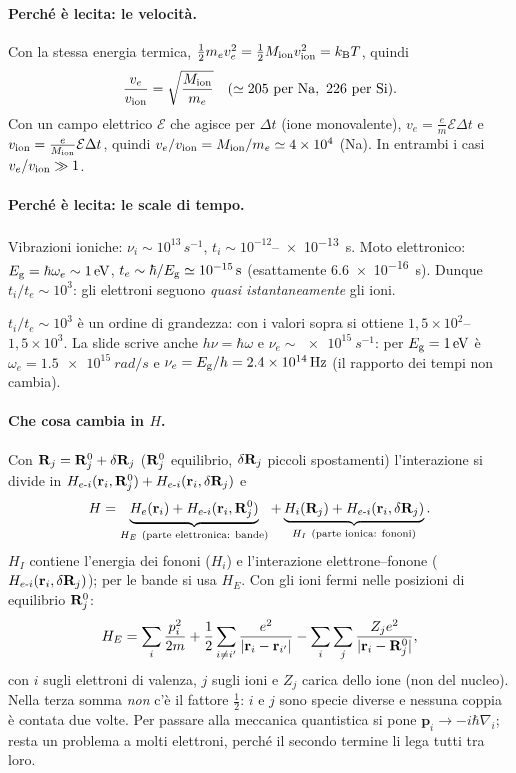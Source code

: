 \documentclass[11pt,a4paper]{article}
\begin{document}
\paragraph{Perché è lecita: le velocità.} Con la stessa energia termica, $\frac12m_ev_e^2=\frac12M_{\mathrm{ion}}v_{\mathrm{ion}}^2=k_{\mathrm B} T$, quindi
\[
\frac{v_e}{\vion}=\sqrt{\frac{M_{\mathrm{ion}}}{m_e}}\quad(\simeq205\ \text{per Na},\ 226\ \text{per Si}).
\]
Con un campo elettrico $\mathcal E$ che agisce per $\Delta t$ (ione monovalente), $v_e=\frac em\mathcal E\Delta t$ e $v_{\mathrm{ion}}=\frac e{M_{\mathrm{ion}}}\mathcal E\Delta t$, quindi
$v_e/v_{\mathrm{ion}}=M_{\mathrm{ion}}/m_e\simeq\num{4e4}$ (Na). In entrambi i casi $v_e/v_{\mathrm{ion}}\gg1$.

\paragraph{Perché è lecita: le scale di tempo.} Vibrazioni ioniche: $\nu_i\sim10^{13}\,\si{s^{-1}}$, $t_i\sim10^{-12}$--\SI{e-13}{s}. Moto elettronico: $E_{\mathrm g}=\hbar\omega_e\sim\SI{1}{eV}$,
$t_e\sim\hbar/E_{\mathrm g}\simeq\SI{e-15}{s}$ (esattamente \SI{6.6e-16}{s}). Dunque $t_i/t_e\sim10^3$: gli elettroni seguono \emph{quasi istantaneamente} gli ioni.

\begin{osservazione}
$t_i/t_e\sim10^3$ è un ordine di grandezza: con i valori sopra si ottiene $1{,}5\times10^2$--$1{,}5\times10^3$. La slide scrive anche $h\nu=\hbar\omega$ e
$\nu_e\sim\SI{e15}{s^{-1}}$: per $E_{\mathrm g}=\SI{1}{eV}$ è $\omega_e=\SI{1.5e15}{rad/s}$ e $\nu_e=E_{\mathrm g}/h=\SI{2.4e14}{Hz}$ (il rapporto dei tempi non cambia).
\end{osservazione}

\paragraph{Che cosa cambia in $H$.} Con $\mathbf R_j=\mathbf R_j^0+\delta\mathbf R_j$ ($\mathbf R_j^0$ equilibrio, $\delta\mathbf R_j$ piccoli spostamenti) l'interazione si divide in
$H_{e\text{-}i}(\mathbf r_i,\mathbf R_j^0)+H_{e\text{-}i}(\mathbf r_i,\delta\mathbf R_j)$ e
\[
H=\underbrace{H_e(\vr_i)+H_{e\text{-}i}(\vr_i,\vR_j^0)}_{H_E\ \text{(parte elettronica: bande)}}
+\underbrace{H_i(\vR_j)+H_{e\text{-}i}(\vr_i,\delta\vR_j)}_{H_I\ \text{(parte ionica: fononi)}}.
\]
$H_I$ contiene l'energia dei fononi ($H_i$) e l'interazione elettrone--fonone ($H_{e\text{-}i}(\mathbf r_i,\delta\mathbf R_j)$); per le bande si usa $H_E$. Con gli
ioni fermi nelle posizioni di equilibrio $\mathbf R_j^0$:
\[
H_E=\sum_i\frac{p_i^2}{2m}+\frac12\sum_{i\ne i'}\frac{e^2}{|\mathbf r_i-\mathbf r_{i'}|}
-\sum_i\sum_j\frac{Z_je^2}{|\mathbf r_i-\mathbf R_j^0|},
\]
con $i$ sugli elettroni di valenza, $j$ sugli ioni e $Z_j$ carica dello ione (non del nucleo). Nella terza somma \emph{non} c'è il fattore
$\frac12$: $i$ e $j$ sono specie diverse e nessuna coppia è contata due volte. Per passare alla meccanica quantistica si pone $\mathbf p_i\to-i\hbar\nabla_i$;
resta un problema a molti elettroni, perché il secondo termine li lega tutti tra loro.
\end{document}
